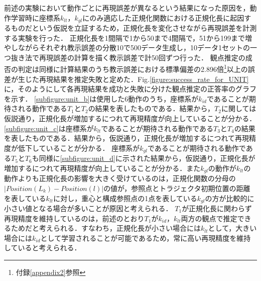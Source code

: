 前述の実験において動作ごとに再現誤差が異なるという結果になった原因を，動作学習時に座標系$k_{lt}$，$k_{gl}$にのみ適応した正規化関数における正規化長に起因するものだという仮説を立証するため，正規化長を変化させながら再現誤差を計測する実験を行った．
正規化長を1間隔で1から50まで4間隔で，51から199まで増やしながらそれぞれ教示誤差の分散10で500データ生成し，10データ1セットの一つ抜き法で再現誤差の計算を描く教示誤差で計50回ずつ行った．
観点推定の成否の判定は同様に計算結果のうち教示誤差における標準偏差の2.896倍\footnote{付録\ref{appendix2}参照}以上の誤差が生じた再現結果を推定失敗と定めた．Fig.\ref{figure:success_rate_for_UNIT}に，そのようにして各再現結果を成功と失敗に分けた観点推定の正答率のグラフを示す．
\ref{subfigure:unit_b}は使用した6動作のうち，座標系が$k_{id}$であることが期待される動作である$T_{1}$と$T_{2}$の結果を表したものである．結果から，$T_{2}$に関しては仮説通り，正規化長が増加するにつれて再現精度が向上していることが分かる．
\ref{subfigure:unit_c}は座標系が$k_{lt}$であることが期待される動作である$T_{3}$と$T_{4}$の結果を表したものである．結果から，仮説通り，正規化長が増加するにつれて再現精度が低下していることが分かる．
座標系が$k_{gl}$であることが期待される動作である$T_{5}$と$T_{6}$も同様に\ref{subfigure:unit_d}に示された結果から，仮説通り，正規化長が増加するにつれて再現精度が向上していることが分かる．また$k_{gl}$の動作が$k_{lt}$の動作よりも正規化長の影響を大きく受けているのは，正規化関数の分母の$| Position(L_{k})-Position(l) |$の値が，参照点とトラジェクタ初期位置の距離を表している$k_{lt}$に対し，重心と構成参照点の1点を表している$k_{gl}$の方が比較的に小さい値となる場合が多いことが原因と考えられる．
$T_{1}$が正規化長に関わらず再現精度を維持しているのは，前述のとおり$T_{1}$が$k_{id}$，$k_{lt}$両方の観点で推定できるためだと考えられる．すなわち，正規化長が小さい場合には$k_{lt}$として，大きい場合には$k_{id}$として学習されることが可能であるため，常に高い再現精度を維持していると考えられる．

